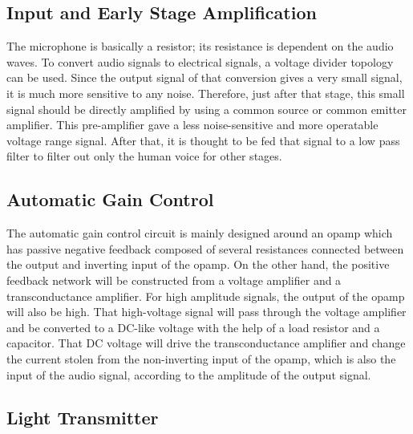 \documentclass[a4paper,10pt]{IEEEtran}
\begin{document}
\subsection{Input and Early Stage Amplification}
The microphone is basically a resistor; its resistance is dependent on the audio waves. To convert audio signals to electrical signals, a voltage divider topology can be used. Since the output signal of that conversion gives a very small signal, it is much more sensitive to any noise. Therefore, just after that stage, this small signal should be directly amplified by using a common source or common emitter amplifier. This pre-amplifier gave a less noise-sensitive and more operatable voltage range signal. After that, it is thought to be fed that signal to a low pass filter to filter out only the human voice for other stages. 
\vspace{-0.5cm}
\subsection{Automatic Gain Control}

The automatic gain control circuit is mainly designed around an opamp which has passive negative feedback composed of several resistances connected between the output and inverting input of the opamp. On the other hand, the positive feedback network will be constructed from a voltage amplifier and a transconductance amplifier. For high amplitude signals, the output of the opamp will also be high. That high-voltage signal will pass through the voltage amplifier and be converted to a DC-like voltage with the help of a load resistor and a capacitor. That DC voltage will drive the transconductance amplifier and change the current stolen from the non-inverting input of the opamp, which is also the input of the audio signal, according to the amplitude of the output signal. 
\vspace{-0.3cm}

\subsection{Light Transmitter}
\end{document}
